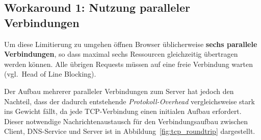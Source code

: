 \documentclass[a4paper, justified, notoc]{tufte-handout} %
\begin{document}
\subsection{Workaround 1: Nutzung paralleler Verbindungen} %
\label{sub:workaround_1_nutzung_paralleler_verbindungen}

Um diese Limitierung zu umgehen öffnen Browser üblicherweise \textbf{sechs parallele Verbindungen}, so dass maximal sechs Ressourcen gleichzeitig übertragen werden können. Alle übrigen Requests müssen auf eine freie Verbindung warten (vgl.\ Head of Line Blocking). %

Der Aufbau mehrerer paralleler Verbindungen zum Server hat jedoch den Nachteil, dass der dadurch entstehende \emph{Protokoll-Overhead} vergleichsweise stark ins Gewicht fällt, da jede TCP-Verbindung einen initialen Aufbau erfordert. Dieser notwendige Nachrichtenaustausch für den Verbindungsaufbau zwischen Client, DNS-Service und Server ist in Abbildung~\ref{fig:tcp_roundtrip} dargestellt.
\end{document}
